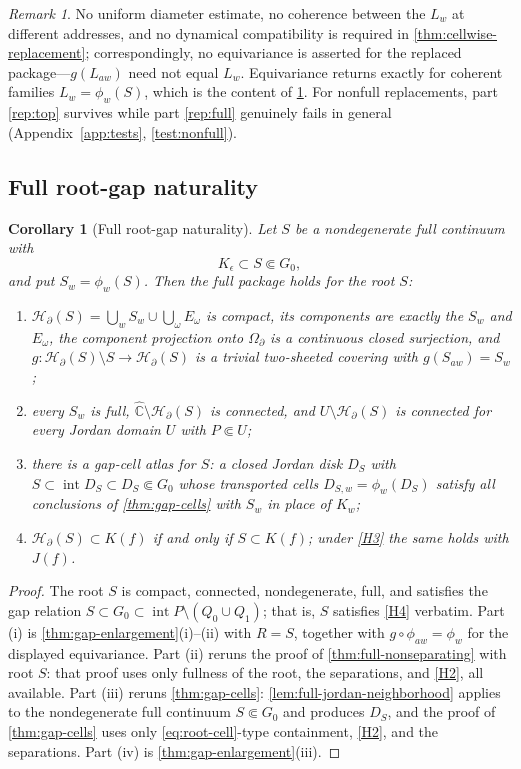 \documentclass[11pt,reqno]{amsart}
\numberwithin{equation}{section}
\theoremstyle{plain}
\newtheorem{corollary}[theorem]{Corollary}
\theoremstyle{definition}
\theoremstyle{remark}
\newtheorem{remark}[theorem]{Remark}
\newcommand{\Chat}{\widehat{\mathbb C}}
\newcommand{\OmB}{\Omega_\partial}
\newcommand{\HB}{\mathcal H_\partial}
\newcommand{\rootK}{K_{\epsilon}}
\begin{document}
\begin{remark}
\label{rem:replacement-scope}
No uniform diameter estimate, no coherence between the $L_w$ at
different addresses, and no dynamical compatibility is required in
\cref{thm:cellwise-replacement}; correspondingly, no equivariance is
asserted for the replaced package---$g(L_{aw})$ need not equal $L_w$.
Equivariance returns exactly for coherent families
$L_w=\phi_w(S)$, which is the content of \cref{cor:full-root}.  For
nonfull replacements, part \ref{rep:top} survives while part
\ref{rep:full} genuinely fails in general
(Appendix~\ref{app:tests}, \cref{test:nonfull}).
\end{remark}

\subsection{Full root-gap naturality}

\begin{corollary}[Full root-gap naturality]
\label{cor:full-root}
Let $S$ be a nondegenerate full continuum with
\[
 \rootK\subset S\Subset G_0 ,
\]
and put $S_w=\phi_w(S)$.  Then the full package holds for the root $S$:
\begin{enumerate}[label=\textup{(\roman*)}]
 \item $\HB(S)=\bigcup_wS_w\cup\bigcup_\omega E_\omega$ is compact,
  its components are exactly the $S_w$ and $E_\omega$, the component
  projection onto $\OmB$ is a continuous closed surjection, and
  $g\colon\HB(S)\setminus S\to\HB(S)$ is a trivial two-sheeted covering
  with $g(S_{aw})=S_w$;
 \item every $S_w$ is full, $\Chat\setminus\HB(S)$ is connected, and
  $U\setminus\HB(S)$ is connected for every Jordan domain $U$ with
  $P\Subset U$;
 \item there is a gap-cell atlas for $S$: a closed Jordan disk $D_S$
  with $S\subset\operatorname{int}D_S\subset D_S\Subset G_0$ whose
  transported cells $D_{S,w}=\phi_w(D_S)$ satisfy all conclusions of
  \cref{thm:gap-cells} with $S_w$ in place of $K_w$;
 \item $\HB(S)\subset K(f)$ if and only if $S\subset K(f)$; under
  \ref{H3} the same holds with $J(f)$.
\end{enumerate}
\end{corollary}

\begin{proof}
The root $S$ is compact, connected, nondegenerate, full, and satisfies
the gap relation
$S\subset G_0\subset\operatorname{int}P\setminus(Q_0\cup Q_1)$; that
is, $S$ satisfies \ref{H4} verbatim.  Part (i) is
\cref{thm:gap-enlargement}(i)--(ii) with $R=S$, together with
$g\circ\phi_{aw}=\phi_w$ for the displayed equivariance.  Part (ii)
reruns the proof of \cref{thm:full-nonseparating} with root $S$: that
proof uses only fullness of the root, the separations, and \ref{H2},
all available.  Part (iii) reruns \cref{thm:gap-cells}:
\cref{lem:full-jordan-neighborhood} applies to the nondegenerate full
continuum $S\Subset G_0$ and produces $D_S$, and the proof of
\cref{thm:gap-cells} uses only \eqref{eq:root-cell}-type containment,
\ref{H2}, and the separations.  Part (iv) is
\cref{thm:gap-enlargement}(iii).
\end{proof}
\end{document}
